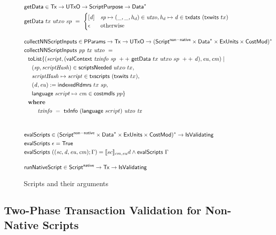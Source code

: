 \begin{figure}[htb]
  \begin{align*}
    & \fun{getData} \in \Tx \to \UTxO \to \ScriptPurpose \to \seqof{\Data} \\
    & \fun{getData}~{tx}~{utxo}~{sp}~=~
      \begin{cases}
        [\var{d}] & \var{sp} \mapsto (\_, \_, h_d) \in \var{utxo}, \var{h_d}\mapsto \var{d} \in \fun{txdats}~(\fun{txwits}~tx) \\
        \epsilon  & \text{otherwise}
      \end{cases}
    \nextdef
    & \fun{collectNNScriptInputs} \in \PParams \to \Tx \to \UTxO \to \seqof{(\ScriptNonNative \times \seqof{\Data} \times \ExUnits \times \CostMod)} \\
    & \fun{collectNNScriptInputs} ~\var{pp}~\var{tx}~ \var{utxo} ~=~ \\
    & ~~\fun{toList} \{ (\var{script}, (\fun{valContext}~\var{txinfo}~\var{sp}~++~ \fun{getData}~tx~utxo~sp~++~\var{d}), \var{eu}, \var{cm}) \mid \\
    & ~~~~(\var{sp}, \var{scriptHash}) \in \fun{scriptsNeeded}~{utxo}~{tx}, \\
    & ~~~~\var{scriptHash}\mapsto \var{script}\in \fun{txscripts}~(\fun{txwits}~tx), \\
    & ~~~~(\var{d}, \var{eu}) := \fun{indexedRdmrs}~tx~sp, \\
    & ~~~~\fun{language}~{script} \mapsto \var{cm} \in \fun{costmdls}~{pp} \} \\
    & \where \\
    & ~~~~~~~ \var{txinfo}~=~\fun{txInfo}~(\fun{language}~{script})~\var{utxo}~\var{tx} \\
    \nextdef
    & \fun{evalScripts} \in \seqof{(\ScriptNonNative \times \seqof{\Data} \times \ExUnits \times \CostMod)} \to \IsValidating \\
    & \fun{evalScripts}~\epsilon = \True \\
    & \fun{evalScripts}~((\var{sc}, \var{d}, \var{eu}, \var{cm});\Gamma) =
      \llbracket sc \rrbracket_{cm,\var{eu}} d \land \fun{evalScripts}~\Gamma
    \nextdef
    &\fun{runNativeScript} \in\ScriptNative \to \Tx \to \IsValidating
  \end{align*}
  \caption{Scripts and their arguments}
  \label{fig:functions:script2}
\end{figure}

\subsection{Two-Phase Transaction Validation for Non-Native Scripts}
\label{sec:two-phase}

